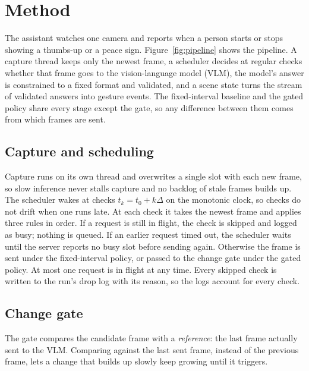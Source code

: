 \section{Method}
\label{sec:method}



The assistant watches one camera and reports when a person starts or stops showing a thumbs-up or a peace sign.
Figure~\ref{fig:pipeline} shows the pipeline.
A capture thread keeps only the newest frame, a scheduler decides at regular checks whether that frame goes to the vision-language model (VLM), the model's answer is constrained to a fixed format and validated, and a scene state turns the stream of validated answers into gesture events.
The fixed-interval baseline and the gated policy share every stage except the gate, so any difference between them comes from which frames are sent.

\subsection{Capture and scheduling}
\label{sec:schedule}
Capture runs on its own thread and overwrites a single slot with each new frame, so slow inference never stalls capture and no backlog of stale frames builds up.
The scheduler wakes at checks $t_k = t_0 + k\Delta$ on the monotonic clock, so checks do not drift when one runs late.
At each check it takes the newest frame and applies three rules in order.
If a request is still in flight, the check is skipped and logged as busy; nothing is queued.
If an earlier request timed out, the scheduler waits until the server reports no busy slot before sending again.
Otherwise the frame is sent under the fixed-interval policy, or passed to the change gate under the gated policy.
At most one request is in flight at any time.
Every skipped check is written to the run's drop log with its reason, so the logs account for every check.

\subsection{Change gate}
\label{sec:gate}
The gate compares the candidate frame with a \emph{reference}: the last frame actually sent to the VLM.
Comparing against the last sent frame, instead of the previous frame, lets a change that builds up slowly keep growing until it triggers.

